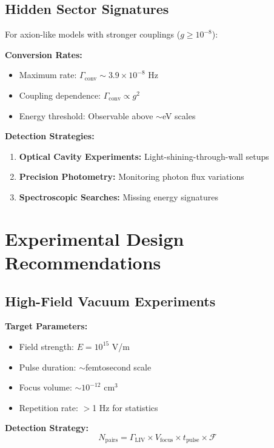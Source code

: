 \documentclass[12pt]{article}
\begin{document}
\subsection{Hidden Sector Signatures}

For axion-like models with stronger couplings ($g \geq 10^{-8}$):

\textbf{Conversion Rates:}
\begin{itemize}
\item Maximum rate: $\Gamma_{\text{conv}} \sim 3.9 \times 10^{-8}$ Hz
\item Coupling dependence: $\Gamma_{\text{conv}} \propto g^2$
\item Energy threshold: Observable above $\sim$eV scales
\end{itemize}

\textbf{Detection Strategies:}
\begin{enumerate}
\item \textbf{Optical Cavity Experiments:} Light-shining-through-wall setups
\item \textbf{Precision Photometry:} Monitoring photon flux variations
\item \textbf{Spectroscopic Searches:} Missing energy signatures
\end{enumerate}

\section{Experimental Design Recommendations}

\subsection{High-Field Vacuum Experiments}

\textbf{Target Parameters:}
\begin{itemize}
\item Field strength: $E = 10^{15}$ V/m
\item Pulse duration: $\sim$femtosecond scale
\item Focus volume: $\sim 10^{-12}$ cm$^3$
\item Repetition rate: $>$1 Hz for statistics
\end{itemize}

\textbf{Detection Strategy:}
\begin{equation}
N_{\text{pairs}} = \Gamma_{\text{LIV}} \times V_{\text{focus}} \times t_{\text{pulse}} \times \mathcal{F}
\end{equation}
\end{document}
